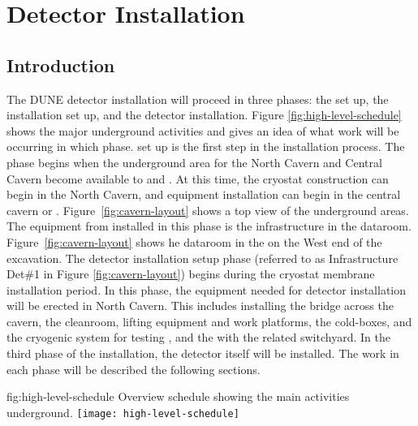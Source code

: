 \section{Detector Installation}
\label{sec:fdsp-tc-inst}

\subsection{Introduction}
\label{sec:fdsp-tc-inst-intro} 

The DUNE detector installation will proceed in three phases: the  set up, the installation set up, and the detector installation. Figure \ref{fig:high-level-schedule} 
shows the major underground activities and gives an idea of what work will be occurring in which phase.  set up is the first step in the installation process. The phase begins when the underground area for the North Cavern and Central Cavern become available to  and . At this time, the cryostat construction can begin in the North Cavern, and  equipment installation can begin in the central cavern or . Figure~\ref{fig:cavern-layout} shows a top view of the underground areas. The equipment from  installed in this phase is the infrastructure in the  dataroom. Figure~\ref{fig:cavern-layout} shows he dataroom in the  on the West end of the excavation. The detector installation setup phase (referred to as Infrastructure Det\#1 in Figure \ref{fig:cavern-layout}) begins during the cryostat membrane installation period. In this phase, the equipment needed for detector installation will be erected in North Cavern. This includes installing the bridge across the cavern, the cleanroom, lifting equipment and work platforms, the cold-boxes,  and the cryogenic system for testing , and the  with the related switchyard. In the third phase of the installation, the detector itself will be installed. The work in each phase will be described the following sections.

\begin{dunefigure}{fig:high-level-schedule}
  {Overview schedule showing the main activities underground.}
\texttt{[image: high-level-schedule]}
\end{dunefigure}

